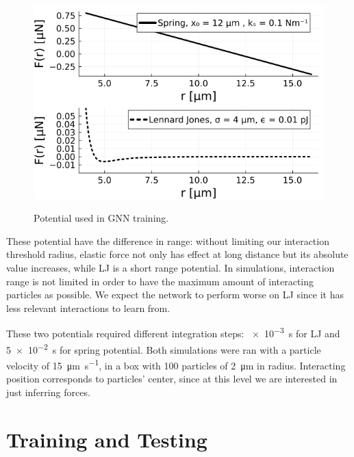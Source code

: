 \documentclass[../../master_thesis_np.tex]{subfiles}
\begin{document}
\begin{figure}[htp]
	\includegraphics[width=\textwidth]{mlpotentials.png}
	\label{fig:mlpotentials}
	\caption{Potential used in GNN training.}
\end{figure}
These potential have the difference in range: without limiting our interaction threshold radius, elastic force not only has effect at long distance but its absolute value increases, while LJ is a short range potential.
In simulations, interaction range is not limited in order to have the maximum amount of interacting particles as possible.
We expect the network to perform worse on LJ since it has less relevant interactions to learn from.

These two potentials required different integration steps: \SI{e-3}{\second} for LJ and \SI{5e-2}{\second} for spring potential.
Both simulations were ran with a particle velocity of \SI{15}{\um \per \second}, in a  box with \num{100} particles of \SI{2}{\um} in radius.
Interacting position corresponds to particles' center, since at this level we are interested in just inferring forces.

\section{Training and Testing}
\end{document}
